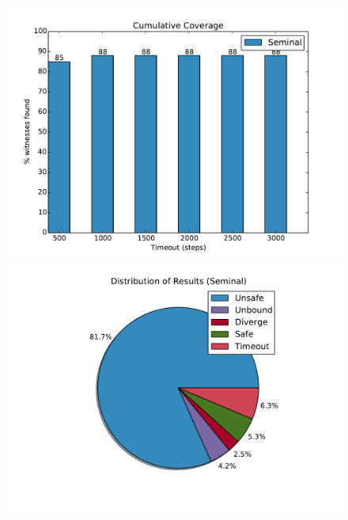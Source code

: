 \begin{figure}[t]
  \centering

\begin{minipage}{\linewidth}
\includegraphics[width=\linewidth]{coverage.pdf}
\end{minipage}
\begin{minipage}{\linewidth}
\includegraphics[width=\linewidth]{distrib_seminal.pdf}
\end{minipage}


\end{figure}
